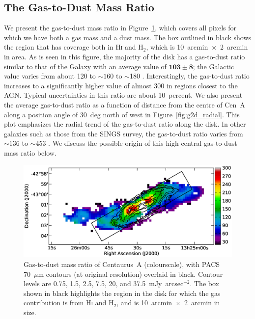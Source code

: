 \documentclass[useAMS,usenatbib,usegraphicx]{mn2e}
\begin{document}
\subsection{The Gas-to-Dust Mass Ratio}\label{subsec:gas2dust}
We present the gas-to-dust mass ratio in Figure~\ref{fig:g2d}, which covers all pixels for which we have both a gas mass and a dust mass.  The box outlined in black shows the region that has coverage both in H\textsc{i} and H$_{2}$, which is 10~arcmin~$\times$~2~arcmin in area.  As is seen in this figure, the majority of the disk has a gas-to-dust ratio similar to that of the Galaxy with an average value of $\mathbf{103 \pm 8}$; the Galactic value varies from about 120 \citep{2001ApJ...554..778L} to $\sim 160$ \citep{2004ApJS..152..211Z} to $\sim$180 \citep[][and references therein]{2007ApJ...663..866D}.  Interestingly, the gas-to-dust ratio increases to a significantly higher value of almost 300 in regions closest to the AGN.  Typical uncertainties in this ratio are about 10~percent.  We also present the average gas-to-dust ratio as a function of distance from the centre of Cen~A along a position angle of 30~deg north of west in Figure~\ref{fig:g2d_radial}. This plot emphasizes the radial trend of the gas-to-dust ratio along the disk. In other galaxies such as those from the SINGS survey, the gas-to-dust ratio varies from $\sim 136$ to $\sim 453$ \citep{2007ApJ...663..866D}.  We discuss the possible origin of this high central gas-to-dust mass ratio below.
\begin{figure}
\includegraphics[width=15cm]{Fig7_CenA_G2D}
\caption{Gas-to-dust mass ratio of Centaurus~A (colourscale), with PACS 70~$\mu$m contours (at original resolution) overlaid in black.  Contour levels are 0.75, 1.5, 2.5, 7.5, 20, and 37.5~mJy~arcsec$^{-2}$.  The box shown in black highlights the region in the disk for which the gas contribution is from H\textsc{i} and H$_{2}$, and is 10~arcmin~$\times$~2~arcmin in size.}
\label{fig:g2d}
\end{figure}
\end{document}
